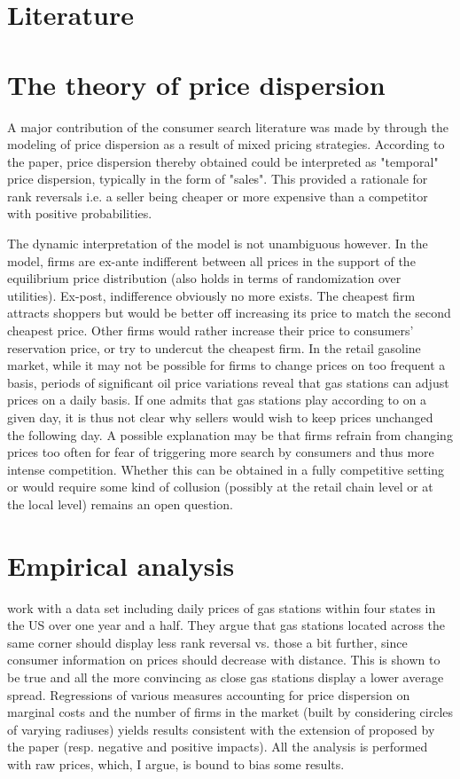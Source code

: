 \documentclass[english]{article}
\begin{document}
\section{Literature}

\section{The theory of price dispersion}

A major contribution of the consumer search literature was made by \cite{VAR80} through the modeling of price dispersion as a result of mixed pricing strategies. According to the paper, price dispersion thereby obtained could be interpreted as "temporal" price dispersion, typically in the form of "sales". This provided a rationale for rank reversals i.e. a seller being cheaper or more expensive than a competitor with positive probabilities.

The dynamic interpretation of the model is not unambiguous however. In the model, firms are ex-ante indifferent between all prices in the support of the equilibrium price distribution (also holds in terms of randomization over utilities). Ex-post, indifference obviously no more exists. The cheapest firm attracts shoppers but would be better off increasing its price to match the second cheapest price. Other firms would rather increase their price to consumers' reservation price, or try to undercut the cheapest firm. In the retail gasoline market, while it may not be possible for firms to change prices on too frequent a basis, periods of significant oil price variations reveal that gas stations can adjust prices on a daily basis. If one admits that gas stations play according to \cite{VAR80} on a given day, it is thus not clear why sellers would wish to keep prices unchanged the following day. A possible explanation may be that firms refrain from changing prices too often for fear of triggering more search by consumers and thus more intense competition. Whether this can be obtained in a fully competitive setting  or would require some kind of collusion (possibly at the retail chain level or at the local level) remains an open question.

\section{Empirical analysis}

\cite{TAP11} work with a data set including daily prices of gas stations within four states in the US over one year and a half. They argue that gas stations located across the same corner should display less rank reversal vs. those a bit further, since consumer information on prices should decrease with distance. This is shown to be true and all the more convincing as close gas stations display a lower average spread. Regressions of various measures accounting for price dispersion on marginal costs and the number of firms in the market (built by considering circles of varying radiuses) yields results consistent with the extension of \cite{VAR80} proposed by the paper (resp. negative and positive impacts). All the analysis is performed with raw prices, which, I argue, is bound to bias some results.
\end{document}
